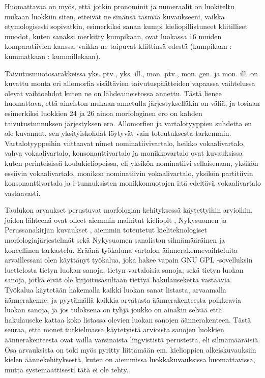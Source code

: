 \documentclass[free]{flammie}
\begin{document}
Huomattavaa on myös, että jotkin pronominit ja numeraalit on luokiteltu mukaan
luokkiin siten, etteivät ne sinänsä täsmää kuvaukseeni, vaikka etymologisesti sopivatkin, esimerkiksi sanan kumpi kieliopillistuneet kliitilliset muodot, kuten sanaksi merkitty kumpikaan, ovat luokassa 16 muiden komparatiivien kanssa, vaikka ne
taipuvat kliittinsä edestä (kumpikaan : kummatkaan : kummillekaan).

Taivutusmuotosarakkeissa yks. ptv., yks. ill., mon. ptv., mon. gen. ja mon. ill. on
kuvattu monta eri allomorfia sisältävien taivutuspäätteiden vapaassa vaihtelussa
olevat vaihtoehdot kuten ne on lähdeaineistossa annettu. Tästä lienee huomattava,
että aineiston mukaan annetulla järjestykselläkin on väliä, ja tosiaan esimerkiksi
luokkien 24 ja 26 ainoa morfologinen ero on kahden taivutustunnuksen järjestyksen ero.
Allomorfien ja vartalotyyppien suhdetta en ole kuvannut, sen yksityiskohdat löytyvät vain toteutuksesta tarkemmin. Vartalotyyppeihin viittaavat nimet nominatiivivartalo, heikko vokaalivartalo, vahva vokaalivartalo, konsonanttivartalo ja monikkovartalo ovat kuvauksissa kuten perinteisissä koulukieliopeissa, eli yksikön
nominatiivi sellaisenaan, yksikön essiivin vokaalivartalo, monikon nominatiivin
vokaalivartalo, yksikön partitiivin konsonanttivartalo ja i-tunnuksisten monikkomuotojen i:tä edeltävä vokaalivartalo vastaavasti.

Taulukon arvaukset perustuvat morfologian kehityksessä käytettyihin arvioihin,
joiden lähteenä ovat olleet aiemmin mainitut kieliopit
\cite{remes2004,setala1930suomen}, Nykysuomen ja Perussanakirjan kuvaukset
\cite{eronen1994nykysuomen,eronen1997suomen}, aiemmin toteutetut kieliteknologiset morfologiajärjestelmät \cite{koskenniemi1983twolevel} sekä
Nykysuomen sanalistan silmämääräinen ja koneellinen tarkastelu. Eräänä työkaluna vartalon äännerakennevaihteluita arvaillessani olen käyttänyt työkalua, joka
hakee vapain GNU GPL -sovelluksin luettelosta tietyn luokan sanoja, tietyn vartaloisia sanoja, sekä tietyn luokan sanoja, jotka eivät ole kirjoitusasultaan tiettyä
hakulauseketta vastaavia. Työkalua käytetään hakemalla kaikki luokan sanat listasta, arvaamalla äännerakenne, ja pyytämällä kaikkia arvatusta äännerakenteesta
poikkeavia luokan sanoja, ja jos tuloksena on tyhjä joukko on ainakin selvää että hakulauseke kattaa koko listassa olevien luokan sanojen äännerakenteen. Tästä
seuraa, että monet tutkielmassa käytetyistä arvioista sanojen luokkien äännerakenteesta ovat vailla varsinaista lingvististä perustetta, eli silmämääräisiä. Osa arvauksista on toki myös pyritty liittämään em. kielioppien alkeiskuvauksiin kielen
äännekehityksestä, kuten on aiemmissa luokkakuvauksissa huomattavissa, mutta
systemaattisesti tätä ei ole tehty.
\end{document}
